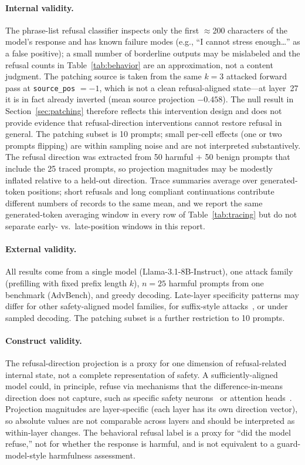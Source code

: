 \documentclass{article}
\begin{document}
\paragraph{Internal validity.}
The phrase-list refusal classifier inspects only the first $\approx$200
characters of the model's response and has known failure modes (e.g.,
``I cannot stress enough\ldots'' as a false positive); a small number of
borderline outputs may be mislabeled and the refusal counts in
Table~\ref{tab:behavior} are an approximation, not a content judgment.
The patching source is taken from the same $k=3$ attacked forward pass at
\texttt{source\_pos} $= -1$, which is not a clean refusal-aligned state---at
layer~27 it is in fact already inverted (mean source projection $-0.458$).
The null result in Section~\ref{sec:patching} therefore reflects this
intervention design and does not provide evidence that
refusal-direction interventions cannot restore refusal in general. The
patching subset is 10 prompts; small per-cell effects (one or two
prompts flipping) are within sampling noise and are not interpreted
substantively. The refusal direction was extracted from 50 harmful + 50
benign prompts that include the 25 traced prompts, so projection magnitudes
may be modestly inflated relative to a held-out direction. Trace summaries
average over generated-token positions; short refusals and long compliant
continuations contribute different numbers of records to the same mean,
and we report the same generated-token averaging window in every row of
Table~\ref{tab:tracing} but do not separate early- vs.\ late-position
windows in this report.

\paragraph{External validity.}
All results come from a single model (Llama-3.1-8B-Instruct), one attack
family (prefilling with fixed prefix length $k$), $n=25$ harmful prompts
from one benchmark (AdvBench), and greedy decoding. Late-layer specificity
patterns may differ for other safety-aligned model families, for suffix-style
attacks~\cite{zou2023advbench}, or under sampled decoding. The patching
subset is a further restriction to 10 prompts.

\paragraph{Construct validity.}
The refusal-direction projection is a proxy for one dimension of refusal-related
internal state, not a complete representation of safety. A
sufficiently-aligned model could, in principle, refuse via mechanisms that
the difference-in-means direction does not capture, such as specific safety
neurons~\cite{chen2025safetyneurons} or attention heads~\cite{zhou2025safetyheads}.
Projection magnitudes are layer-specific (each layer has its own
direction vector), so absolute values are not comparable across layers and
should be interpreted as within-layer changes. The behavioral refusal label is
a proxy for ``did the model refuse,'' not for whether the response is
harmful, and is not equivalent to a guard-model-style harmfulness assessment.

{\small


}
\end{document}
